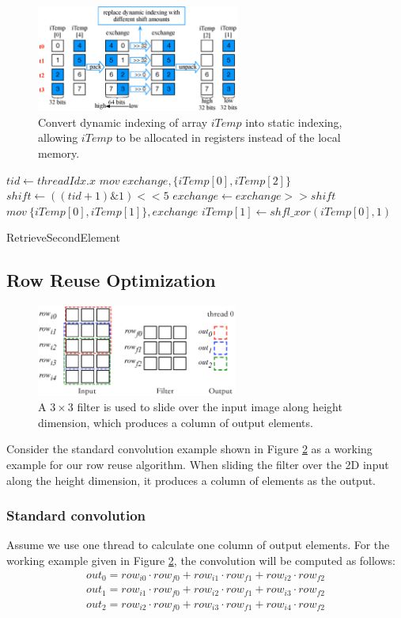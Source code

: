 \begin{figure}[t!]
	\centering
	\includegraphics[width=0.8\columnwidth,height=3.5cm]{./figure/exchange.eps}
\caption{Convert dynamic indexing of array $iTemp$ into static indexing, allowing  $iTemp$ to be allocated in registers instead of the local memory.}
\label{fig:exchange}
\end{figure}

\begin{algorithm}[t!]
\small
	$tid \gets threadIdx.x$\;
	$mov\ exchange, \{iTemp[0], iTemp[2]\}$\;
	$shift \gets ((tid+1)\&1)<<5$\;
	$exchange \gets exchange >> shift$\;
	$mov\ \{iTemp[0],iTemp[1]\}, exchange$\;
	$iTemp[1] \gets shfl\_xor(iTemp[0],1)$\;	
	\caption{RetrieveSecondElement}
	\label{algo:basic2}
\end{algorithm}


\subsection{Row Reuse Optimization}
\label{sec:rowreuse}
\begin{figure}[t!]
	\centering
	\includegraphics[width=0.8\columnwidth,height=3cm]{./figure/rowreuse.eps}
\caption{A $3 \times 3$ filter is used to slide over the input image along height dimension, which produces a column of output elements.}
\label{fig:rowreuse}
\end{figure}

 Consider the standard convolution example shown in Figure \ref{fig:rowreuse} as a working example for our row
reuse algorithm. When sliding the filter over the 2D input along the height dimension, it produces a column of elements as the output.

\subsubsection{Standard convolution} Assume we use one thread to calculate one column of output elements.
For the working example given in Figure \ref{fig:rowreuse}, the convolution will be computed as follows:
\begin{gather*}
  out_0=row_{i0} \cdot row_{f0} + row_{i1} \cdot row_{f1} + row_{i2} \cdot row_{f2} \\
out_{1}=row_{i1} \cdot row_{f0} + row_{i2} \cdot row_{f1} + row_{i3} \cdot row_{f2} \\
out_{2}=row_{i2} \cdot row_{f0} + row_{i3} \cdot row_{f1} + row_{i4} \cdot row_{f2}
\end{gather*}

